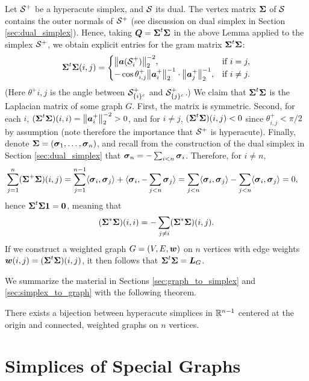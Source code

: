 Let $\mathcal{S}^+$ be a hyperacute simplex, and $\mathcal{S}$ its dual. The vertex matrix $\boldsymbol{\Sigma}$ of $\mathcal{S}$ contains the outer normals of $\mathcal{S}^+$ (see discussion on dual simplex in Section \ref{sec:dual_simplex}). Hence, taking $\vb*{Q}=\boldsymbol{\Sigma}^t \boldsymbol{\Sigma}$ in the above Lemma applied to the simplex $\mathcal{S}^+$, we obtain explicit entries for the gram matrix $\boldsymbol{\Sigma}^t\boldsymbol{\Sigma}$: 
\begin{equation*}
    \boldsymbol{\Sigma}^t \boldsymbol{\Sigma}(i,j) = \begin{cases}
    \norm{\vb*{a}(\mathcal{S}_i^+)}_2^{-2},& \text{if }i=j,\\
-\cos\theta^+_{i,j} \norm{\vb*{a}_i^+}_2^{-1}\cdot \norm{\vb*{a}_j^+}_2^{-1},& \text{if }i\neq j.
    \end{cases}
\end{equation*}
(Here $\theta^+{i,j}$ is the angle between $\mathcal{S}_{\{i\}^c}^+$ and $\mathcal{S}_{\{j\}^c}^+$.)
We claim that $\boldsymbol{\Sigma}^t\boldsymbol{\Sigma}$ is the Laplacian matrix of some graph $G$. First, the matrix is symmetric. Second,
for each $i$, $(\boldsymbol{\Sigma}^t\boldsymbol{\Sigma})(i,i)=\norm{\vb*{a}_i^+}_2^{-2}>0$, and for $i\neq j$, $(\boldsymbol{\Sigma}^t\boldsymbol{\Sigma})(i,j) <0$ since $\theta^+_{i,j}<\pi/2$ by assumption (note therefore the importance that $\mathcal{S}^+$ is hyperacute). Finally, denote $\boldsymbol{\Sigma}=(\vb*{\sigma}_1,\dots,\vb*{\sigma}_n)$, and recall from the construction of the dual simplex in Section \ref{sec:dual_simplex} that $\vb*{\sigma}_n=-\sum_{i<n}\vb*{\sigma}_i$. Therefore, for $i\neq n$, 
\begin{align*}
    \sum_{j=1}^n (\boldsymbol{\Sigma}^+\boldsymbol{\Sigma})(i,j) &= \sum_{j=1}^{n-1} \langle \vb*{\sigma}_i,\vb*{\sigma}_j\rangle + \langle \vb*{\sigma}_i,-\sum_{j<n}\vb*{\sigma}_j\rangle = \sum_{j<n}\langle \vb*{\sigma}_i,\vb*{\sigma}_j\rangle - \sum_{j<n}\langle \vb*{\sigma}_i,\vb*{\sigma}_j\rangle  = 0,
\end{align*}
hence $\boldsymbol{\Sigma}^t\boldsymbol{\Sigma}\vb{1}=\vb{0}$, meaning that 
\[(\boldsymbol{\Sigma}^*\boldsymbol{\Sigma})(i,i) = -\sum_{j\neq i}(\boldsymbol{\Sigma}^*\boldsymbol{\Sigma})(i,j).\]
If we construct a weighted graph $G=(V,E,\vb*{w})$ on $n$ vertices with edge weights $\vb*{w}(i,j) = (\boldsymbol{\Sigma}^t\boldsymbol{\Sigma})(i,j)$, it then follows that $\boldsymbol{\Sigma}^t\boldsymbol{\Sigma}=\vb*{L}_G$. 

We summarize the material in Sections \ref{sec:graph_to_simplex} and \ref{sec:simplex_to_graph} with the following theorem. 

\begin{theorem}
	\label{thm:graph-simplex}
	There exists a bijection between hyperacute simplices in $\mathbb{R}^{n-1}$ centered at the origin and connected, weighted graphs on $n$ vertices. 
\end{theorem}

\section{Simplices of Special Graphs}


